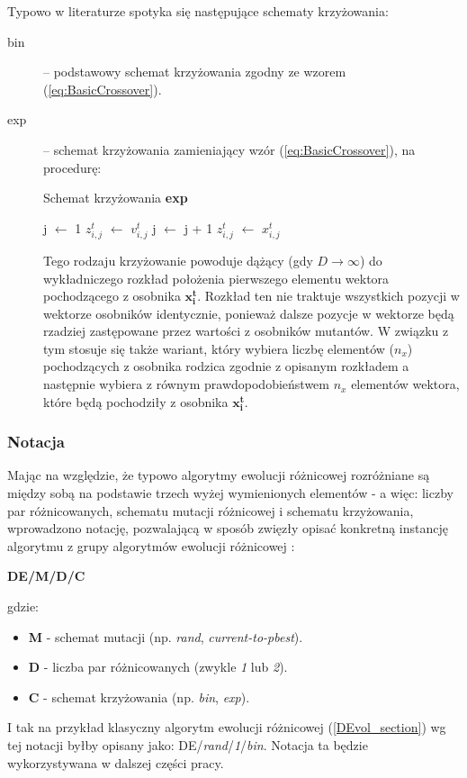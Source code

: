 \documentclass[12pt,a4paper]{report}
\begin{document}
{{{\par{
Typowo w literaturze spotyka się następujące schematy krzyżowania:
\begin{description}
\item[bin] -- podstawowy schemat krzyżowania zgodny ze wzorem (\ref{eq:BasicCrossover}).
\item[exp] -- schemat krzyżowania zamieniający wzór (\ref{eq:BasicCrossover}), na procedurę:
\begin{algorithm}[H]
\caption{Schemat krzyżowania \textbf{exp}}
\label{algorithm:ea}
\begin{algorithmic}[1]
\State j $\gets$ 1
	\State $z_{i,j}^t$ $\gets$ $v_{i,j}^t$
	\State j $\gets$ j + 1
\EndWhile
{}
	\State $z_{i,j}^t$ $\gets$ $x_{i,j}^t$
\EndWhile
\end{algorithmic}
\end{algorithm}

Tego rodzaju krzyżowanie powoduje dążący (gdy $D \rightarrow \infty$) do wykładniczego rozkład położenia pierwszego elementu wektora pochodzącego z osobnika $\mathbf{x_i^t}$. Rozkład ten nie traktuje wszystkich pozycji w wektorze osobników identycznie, ponieważ dalsze pozycje w wektorze będą rzadziej zastępowane przez wartości z osobników mutantów. W związku z tym stosuje się także wariant, który wybiera liczbę elementów ($n_x$) pochodzących z osobnika rodzica zgodnie z opisanym rozkładem a następnie wybiera z równym prawdopodobieństwem $n_x$ elementów wektora, które będą pochodziły z osobnika $\mathbf{x_i^t}$.
\end{description}
}
\subsubsection{Notacja}
\par{
Mając na względzie, że typowo algorytmy ewolucji różnicowej rozróżniane są między sobą na podstawie trzech wyżej wymienionych elementów - a więc: liczby par różnicowanych, schematu mutacji różnicowej i schematu krzyżowania, wprowadzono notację, pozwalającą w sposób zwięzły opisać konkretną instancję algorytmu z grupy algorytmów ewolucji różnicowej \cite{PracticalInsights}:
\begin{center}
\textbf{DE/M/D/C}
\end{center}
gdzie:
\begin{itemize}
\item \textbf{M} - schemat mutacji (np. \emph{rand}, \emph{current-to-pbest}).
\item \textbf{D} - liczba par różnicowanych (zwykle \emph{1} lub \emph{2}).
\item \textbf{C} - schemat krzyżowania (np. \emph{bin}, \emph{exp}).
\end{itemize}
I tak na przykład klasyczny algorytm ewolucji różnicowej (\ref{DEvol_section}) wg tej notacji byłby opisany jako: DE/\emph{rand}/\emph{1}/\emph{bin}. Notacja ta będzie wykorzystywana w dalszej części pracy.
}


}}}
\end{document}
